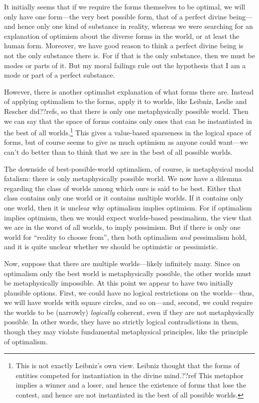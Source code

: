 It initially seems that if we require the forms themselves to be optimal, we will only have one form---the very best
possible form, that of a perfect divine being---and hence only one kind of substance in reality, whereas we were searching for an 
explanation of optimism about the diverse forms in the world, or at least the human form. Moreover, we have good reason to 
think a perfect divine being is not the only substance there is. For if that is the only substance, then we must be modes or 
parts of it. But my moral failings rule out the hypothesis that I am a mode or part of a perfect substance.

However, there is another optimalist explanation of what forms there are. Instead of applying optimalism to the forms, 
apply it to worlds, like Leibniz, Leslie and Rescher did??refs, so that there is only one metaphysically possible world. 
Then we can say that the space of forms contains only ones that 
can be instantiated in the best of all worlds.\footnote{This is not exactly Leibniz's own view. Leibniz thought
that the forms of entities competed for instantiation in the divine mind.??ref This metaphor implies a winner and a loser,
and hence the existence of forms that lose the contest, and hence are not instantiated in the best of all possible worlds.} 
This gives a value-based sparseness in the logical space of forms, but of course seems to give as much optimism as anyone could
want---we can't do better than to think that we are in the best of all possible worlds. 

The downside of best-possible-world optimalism, of course, is metaphysical modal fatalism: there is only metaphysically 
possible world. We now have a dilemma regarding the class of worlds among which ours is said to be best. Either that class
contains only one world or it contains multiple worlds. If it contains only one world, then it is unclear why optimalism
implies optimism. For if optimalism implies optimism, then we would expect worlds-based pessimalism, the view that we are 
in the worst of all worlds, to imply pessimism. But if there is only one world for ``reality to choose from'', then 
both optimalism \textit{and} pessimalism hold, and it is quite unclear whether we should be optimistic or pessimistic.

Now, suppose that there are multiple worlds---likely infinitely many. Since on optimalism only the best world is 
metaphysically possible, the other worlds must be metaphysically impossible. At this point we appear to have two 
initially plausible options. First, we could have no logical restrictions on the worlds---thus, we will have worlds
with square circles, and so on---and, second, we could require the worlds to be (narrowly) \textit{logically} coherent, even if 
they are not metaphysically possible. In other words, they have no strictly logical contradictions in them, though they 
may violate fundamental metaphysical principles, like the principle of optimalism. 

